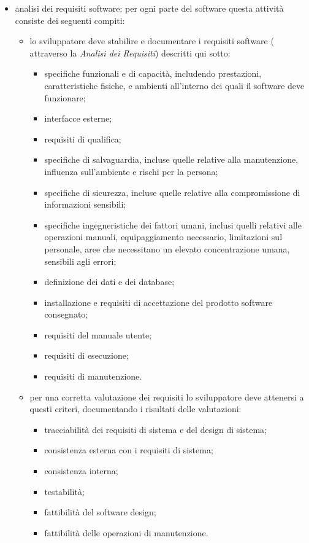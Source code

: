 			\begin{itemize}
			\item analisi dei requisiti software: per ogni parte del software questa attività consiste dei seguenti compiti:
			\begin{itemize}
			\item lo sviluppatore deve stabilire e documentare i requisiti software ( attraverso la \textit{Analisi dei Requisiti}) descritti qui sotto:
			\begin{itemize}
			\item specifiche funzionali e di capacità, includendo prestazioni, caratteristiche fisiche, e ambienti all'interno dei quali il software deve funzionare;
			\item interfacce esterne;
			\item requisiti di qualifica;
			\item specifiche di salvaguardia, incluse quelle relative alla manutenzione, influenza sull'ambiente e rischi per la persona;
			\item specifiche di sicurezza, incluse quelle relative alla compromissione di informazioni sensibili;
			\item specifiche ingegneristiche dei fattori umani, inclusi quelli relativi alle operazioni manuali, equipaggiamento necessario, limitazioni sul personale, aree che necessitano un elevato concentrazione umana, sensibili agli errori;
			\item definizione dei dati e dei database;
			\item installazione e requisiti di accettazione del prodotto software consegnato; 
			\item requisiti del manuale utente;
			\item requisiti di esecuzione;
			\item requisiti di manutenzione.
			\end{itemize}
			\item per una corretta valutazione dei requisiti lo sviluppatore deve attenersi a questi criteri, documentando i risultati delle valutazioni:
			\begin{itemize}
			\item tracciabilità dei requisiti di sistema e del design di sistema;
			\item consistenza esterna con i requisiti di sistema;
			\item consistenza interna;
			\item testabilità;
			\item fattibilità del software design;
			\item fattibilità delle operazioni di manutenzione.
			\end{itemize}
			\end{itemize}
			\end{itemize}
